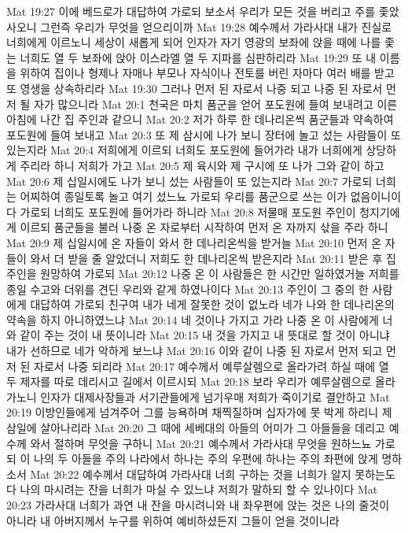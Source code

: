 Mat 19:27  이에 베드로가 대답하여 가로되 보소서 우리가 모든 것을 버리고 주를 좇았사오니 그런즉 우리가 무엇을 얻으리이까
Mat 19:28  예수께서 가라사대 내가 진실로 너희에게 이르노니 세상이 새롭게 되어 인자가 자기 영광의 보좌에 앉을 때에 나를 좇는 너희도 열 두 보좌에 앉아 이스라엘 열 두 지파를 심판하리라
Mat 19:29  또 내 이름을 위하여 집이나 형제나 자매나 부모나 자식이나 전토를 버린 자마다 여러 배를 받고 또 영생을 상속하리라
Mat 19:30  그러나 먼저 된 자로서 나중 되고 나중 된 자로서 먼저 될 자가 많으니라
Mat 20:1  천국은 마치 품군을 얻어 포도원에 들여 보내려고 이른 아침에 나간 집 주인과 같으니
Mat 20:2  저가 하루 한 데나리온씩 품군들과 약속하여 포도원에 들여 보내고
Mat 20:3  또 제 삼시에 나가 보니 장터에 놀고 섰는 사람들이 또 있는지라
Mat 20:4  저희에게 이르되 너희도 포도원에 들어가라 내가 너희에게 상당하게 주리라 하니 저희가 가고
Mat 20:5  제 육시와 제 구시에 또 나가 그와 같이 하고
Mat 20:6  제 십일시에도 나가 보니 섰는 사람들이 또 있는지라
Mat 20:7  가로되 너희는 어찌하여 종일토록 놀고 여기 섰느뇨 가로되 우리를 품군으로 쓰는 이가 없음이니이다 가로되 너희도 포도원에 들어가라 하니라
Mat 20:8  저물매 포도원 주인이 청지기에게 이르되 품군들을 불러 나중 온 자로부터 시작하여 먼저 온 자까지 삯을 주라 하니
Mat 20:9  제 십일시에 온 자들이 와서 한 데나리온씩을 받거늘
Mat 20:10  먼저 온 자들이 와서 더 받을 줄 알았더니 저희도 한 데나리온씩 받은지라
Mat 20:11  받은 후 집 주인을 원망하여 가로되
Mat 20:12  나중 온 이 사람들은 한 시간만 일하였거늘 저희를 종일 수고와 더위를 견딘 우리와 같게 하였나이다
Mat 20:13  주인이 그 중의 한 사람에게 대답하여 가로되 친구여 내가 네게 잘못한 것이 없노라 네가 나와 한 데나리온의 약속을 하지 아니하였느냐
Mat 20:14  네 것이나 가지고 가라 나중 온 이 사람에게 너와 같이 주는 것이 내 뜻이니라
Mat 20:15  내 것을 가지고 내 뜻대로 할 것이 아니냐 내가 선하므로 네가 악하게 보느냐
Mat 20:16  이와 같이 나중 된 자로서 먼저 되고 먼저 된 자로서 나중 되리라
Mat 20:17  예수께서 예루살렘으로 올라가려 하실 때에 열 두 제자를 따로 데리시고 길에서 이르시되
Mat 20:18  보라 우리가 예루살렘으로 올라가노니 인자가 대제사장들과 서기관들에게 넘기우매 저희가 죽이기로 결안하고
Mat 20:19  이방인들에게 넘겨주어 그를 능욕하며 채찍질하며 십자가에 못 박게 하리니 제 삼일에 살아나리라
Mat 20:20  그 때에 세베대의 아들의 어미가 그 아들들을 데리고 예수께 와서 절하며 무엇을 구하니
Mat 20:21  예수께서 가라사대 무엇을 원하느뇨 가로되 이 나의 두 아들을 주의 나라에서 하나는 주의 우편에 하나는 주의 좌편에 앉게 명하소서
Mat 20:22  예수께서 대답하여 가라사대 너희 구하는 것을 너희가 알지 못하는도다 나의 마시려는 잔을 너희가 마실 수 있느냐 저희가 말하되 할 수 있나이다
Mat 20:23  가라사대 너희가 과연 내 잔을 마시려니와 내 좌우편에 앉는 것은 나의 줄것이 아니라 내 아버지께서 누구를 위하여 예비하셨든지 그들이 얻을 것이니라

